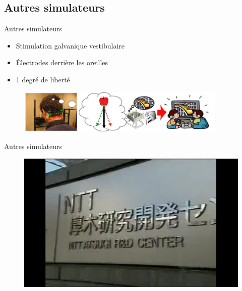 \subsection{Autres simulateurs}

{
\begin{frame}{Autres simulateurs}
\begin{itemize}
\item Stimulation galvanique vestibulaire
\item Électrodes derrière les oreilles
\item 1 degré de liberté
\end{itemize}
\begin{figure}
\centering
\includegraphics[width=10cm]{images/gvs_RV}
\end{figure}
\end{frame}

\begin{frame}{Autres simulateurs}
\begin{figure}
\href{run:videos/GVS.mp4}{\includegraphics[width=\linewidth]{images/gvs}}
\end{figure}

\end{frame}
}

